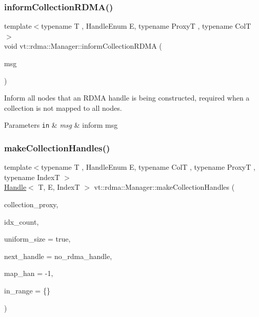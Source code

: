 \subsubsection{\texorpdfstring{inform\+Collection\+R\+D\+M\+A()}{informCollectionRDMA()}}
{\footnotesize\ttfamily template$<$typename T , Handle\+Enum E, typename ProxyT , typename ColT $>$ \\
void vt\+::rdma\+::\+Manager\+::inform\+Collection\+R\+D\+MA (\begin{DoxyParamCaption}\item[{\hyperlink{structvt_1_1rdma_1_1impl_1_1_inform_r_d_m_a_msg}{impl\+::\+Inform\+R\+D\+M\+A\+Msg}$<$ ProxyT, typename Col\+T\+::\+Index\+Type $>$ $\ast$}]{msg }\end{DoxyParamCaption})\hspace{0.3cm}{\ttfamily [private]}}



Inform all nodes that an R\+D\+MA handle is being constructed, required when a collection is not mapped to all nodes. 


\begin{DoxyParams}[1]{Parameters}
\mbox{\tt in}  & {\em msg} & inform msg \\
\hline
\end{DoxyParams}
\mbox{\label{structvt_1_1rdma_1_1_manager_aad62be5c2cb0225139cf3d665b5fd7f2}} 
\subsubsection{\texorpdfstring{make\+Collection\+Handles()}{makeCollectionHandles()}}
{\footnotesize\ttfamily template$<$typename T , Handle\+Enum E, typename ColT , typename ProxyT , typename IndexT $>$ \\
\hyperlink{structvt_1_1rdma_1_1_handle}{Handle}$<$ T, E, IndexT $>$ vt\+::rdma\+::\+Manager\+::make\+Collection\+Handles (\begin{DoxyParamCaption}\item[{ProxyT}]{collection\+\_\+proxy,  }\item[{std\+::size\+\_\+t}]{idx\+\_\+count,  }\item[{bool}]{uniform\+\_\+size = {\ttfamily true},  }\item[{\hyperlink{namespacevt_a10442579ec4e7ebef223818e64bcf908}{R\+D\+M\+A\+\_\+\+Handle\+Type}}]{next\+\_\+handle = {\ttfamily no\+\_\+rdma\+\_\+handle},  }\item[{\hyperlink{namespacevt_af64846b57dfcaf104da3ef6967917573}{vt\+::\+Handler\+Type}}]{map\+\_\+han = {\ttfamily -\/1},  }\item[{IndexT}]{in\+\_\+range = {\ttfamily \{\}} }\end{DoxyParamCaption})}



